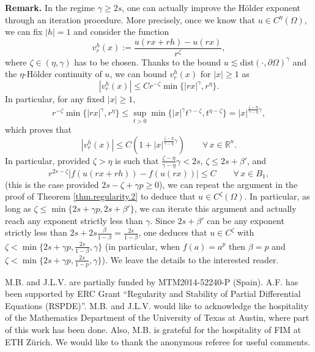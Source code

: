 \documentclass[11pt]{article}
\numberwithin{equation}{section}
\def\dist{\mathrm{dist}} %
\begin{document}

\noindent\textbf{Remark. } In the regime $\gamma\geq 2s$, one can actually improve the H\"older exponent through an iteration procedure. More precisely, once we know that $u\in C^\eta(\Omega)$, we can fix $|h|=1$ and consider the function
$$
v_r^h(x):=\frac{u(rx+rh)-u(rx)}{r^\zeta},
$$
where $\zeta\in (\eta,\gamma)$ has to be chosen.
Thanks to the bound $u\lesssim \dist(\cdot,\partial\Omega)^\gamma$
and the $\eta$-H\"older continuity of $u$,
we can bound $v_r^h(x)$ for $|x|\ge 1$ as
$$
|v_r^h(x)|\leq Cr^{-\zeta}\min\{|rx|^{\gamma},r^\eta\}.
$$
In particular, for any fixed $|x|\ge 1$,
$$
r^{-\zeta}\min\{|rx|^{\gamma},r^\eta\} \leq \sup_{t>0}\min\{|x|^{\gamma}t^{\gamma-\zeta},t^{\eta-\zeta}\}=|x|^{\frac{\zeta-\eta}{\gamma-\eta}\gamma},
$$
which proves that
$$
|v_r^h(x)|\leq C\left(1+|x|^{\frac{\zeta-\eta}{\gamma-\eta}\gamma}\right)\qquad \forall\,x \in \mathbb R^n.
$$
In particular, provided $\zeta>\eta$ is such that $\frac{\zeta-\eta}{\gamma-\eta}\gamma<2s$, $\zeta\leq 2s+\beta'$, and
$$
r^{2s-\zeta}|f(u(rx+rh))-f(u(rx))| \leq C \qquad \forall\, x \in B_1,
$$
(this is the case provided $2s-\zeta+\gamma p\geq 0$),
we can repeat the argument in the proof of Theorem \eqref{thm.regularity.2} to deduce that $u \in C^\zeta(\Omega)$.
In particular, as long as $\zeta\leq \min\{2s+\gamma p,2s+\beta'\}$, we can iterate this argument and actually reach any exponent strictly less than $\gamma$.
Since $2s+\beta'$ can be any exponent strictly less than $2s+2s\frac{\beta}{1-\beta}=\frac{2s}{1-\beta}$,
one deduces that $u \in C^\zeta$ with
$\zeta<\min\{2s+\gamma p,\frac{2s}{1-\beta},\gamma\}$ (in particular, when $f(a)=a^p$ then $\beta=p$ and $\zeta<\min\{2s+\gamma p,\frac{2s}{1-p},\gamma\}$).
We leave the details to the interested reader.


\bigskip

 M.B. and J.L.V. are partially funded by MTM2014-52240-P (Spain). A.F. has been supported by ERC Grant ``Regularity and Stability of Partial Differential Equations (RSPDE)''. M.B. and J.L.V. would like to acknowledge the hospitality of the Mathematics Department of the University of Texas at Austin, where part of this work has been done. Also, M.B. is grateful for the hospitality of FIM at ETH Z\"urich. We would like to thank the anonymous referee for useful comments.
\end{document}
